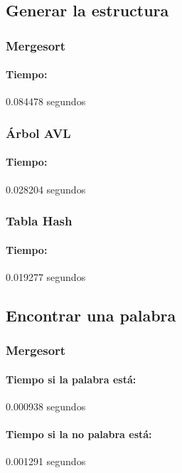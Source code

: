 \documentclass[12pt,letterpaper]{scrartcl}
\begin{document}
\subsection{Generar la estructura}

\subsubsection{Mergesort}

\paragraph{Tiempo:} 0.084478 segundos


\subsubsection{Árbol AVL}

\paragraph{Tiempo:} 0.028204 segundos

\subsubsection{Tabla Hash}

\paragraph{Tiempo:} 0.019277 segundos

\subsection{Encontrar una palabra}

\subsubsection{Mergesort}

\paragraph{Tiempo si la palabra está:} 0.000938 segundos

\paragraph{Tiempo si la no palabra está:} 0.001291 segundos
\end{document}
